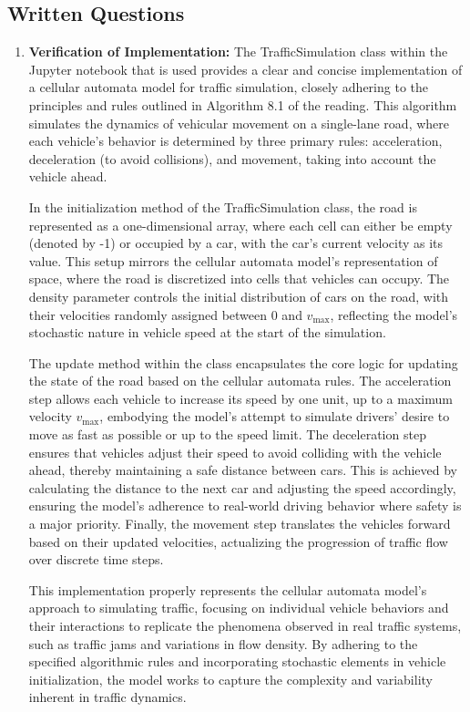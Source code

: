 \documentclass{article}
\begin{document}
\subsection{Written Questions}
\begin{enumerate}
    \item 
    \textbf{Verification of Implementation: } The TrafficSimulation class within the Jupyter notebook that is used provides a clear and concise implementation of a cellular automata model for traffic simulation, closely adhering to the principles and rules outlined in Algorithm 8.1 of the reading. This algorithm simulates the dynamics of vehicular movement on a single-lane road, where each vehicle's behavior is determined by three primary rules: acceleration, deceleration (to avoid collisions), and movement, taking into account the vehicle ahead. 
    
    In the initialization method of the TrafficSimulation class, the road is represented as a one-dimensional array, where each cell can either be empty (denoted by -1) or occupied by a car, with the car's current velocity as its value. This setup mirrors the cellular automata model's representation of space, where the road is discretized into cells that vehicles can occupy. The density parameter controls the initial distribution of cars on the road, with their velocities randomly assigned between 0 and $v_{\text{max}}$, reflecting the model's stochastic nature in vehicle speed at the start of the simulation.

    The update method within the class encapsulates the core logic for updating the state of the road based on the cellular automata rules. The acceleration step allows each vehicle to increase its speed by one unit, up to a maximum velocity $v_{\text{max}}$, embodying the model's attempt to simulate drivers' desire to move as fast as possible or up to the speed limit. The deceleration step ensures that vehicles adjust their speed to avoid colliding with the vehicle ahead, thereby maintaining a safe distance between cars. This is achieved by calculating the distance to the next car and adjusting the speed accordingly, ensuring the model's adherence to real-world driving behavior where safety is a major priority. Finally, the movement step translates the vehicles forward based on their updated velocities, actualizing the progression of traffic flow over discrete time steps.

    This implementation properly represents the cellular automata model's approach to simulating traffic, focusing on individual vehicle behaviors and their interactions to replicate the phenomena observed in real traffic systems, such as traffic jams and variations in flow density. By adhering to the specified algorithmic rules and incorporating stochastic elements in vehicle initialization, the model works to capture the complexity and variability inherent in traffic dynamics.


\end{enumerate}
\end{document}
